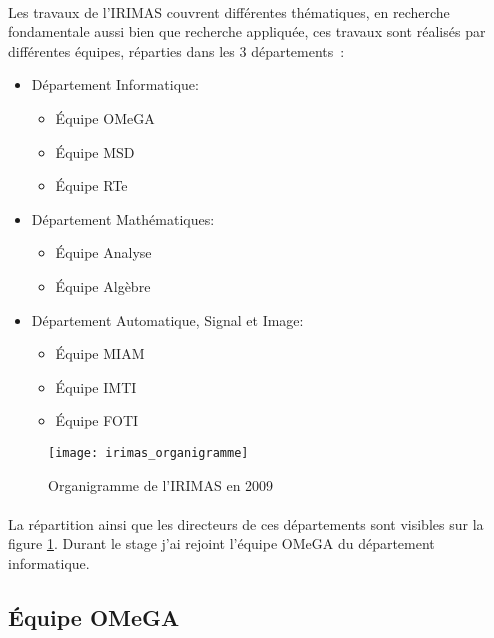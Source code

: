 \documentclass[a4paper,11pt,twoside,french,report]{../common/simplem}
\begin{document}
				\paragraph*{}
					Les travaux de l'\gls{IRIMAS} couvrent différentes thématiques, en recherche fondamentale aussi bien que recherche appliquée, ces travaux sont réalisés par différentes équipes, réparties dans les 3 départements~\cite{UHA_IRIMAS}:
					\begin{itemize}
						\item Département Informatique:
							\begin{itemize}
								\item Équipe \gls{OMeGA}
								\item Équipe \gls{MSD}
								\item Équipe \gls{RTe}
							\end{itemize}
						\item Département Mathématiques:
							\begin{itemize}
								\item Équipe Analyse
								\item Équipe Algèbre
							\end{itemize}
						\item Département Automatique, Signal et Image:
							\begin{itemize}
								\item Équipe \gls{MIAM}
								\item Équipe \gls{IMTI}
								\item Équipe \gls{FOTI}
							\end{itemize}
					\end{itemize}
					\begin{figure}[H]
						\centering%
						\texttt{[image: irimas\_organigramme]}%
						\caption{Organigramme de l'\acrshort{IRIMAS} en 2009~\cite{IRIMAS_Organigramme}}%
						\label{fig:irimas_organigramme}%
					\end{figure}
				\paragraph*{}
					La répartition ainsi que les directeurs de ces départements sont visibles sur la figure \ref{fig:irimas_organigramme}. Durant le stage j'ai rejoint l'équipe \gls{OMeGA} du département informatique.
			\subsection{Équipe \acrshort{OMeGA}}
\end{document}

